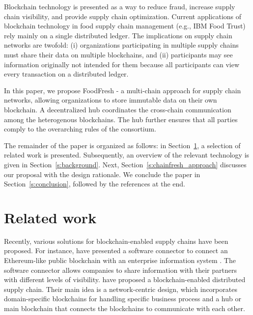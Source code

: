 \documentclass[conference]{IEEEtran}
\begin{document}
Blockchain technology is presented as a way to reduce fraud, increase supply chain visibility, and provide supply chain optimization. Current applications of blockchain technology in food supply chain management (e.g., IBM Food Trust) rely mainly on a single distributed ledger. The implications on supply chain networks are twofold: (i) organizations participating in multiple supply chains must share their data on multiple blockchains, and (ii) participants may see information originally not intended for them because all participants can view every transaction on a distributed ledger. 

In this paper, we propose FoodFresh - a multi-chain approach for supply chain networks, allowing organizations to store immutable data on their own blockchain. A decentralized hub coordinates the cross-chain communication among the heterogenous blockchains.  The hub further ensures that all parties comply to the overarching rules of the consortium. 

The remainder of the paper is organized as follows: in Section~\ref{s:related_work}, a selection of related work is presented. Subsequently, an overview of the relevant technology is given in Section~\ref{s:background}. Next, Section~\ref{s:chainfresh_approach} discusses our proposal with the design rationale. We conclude the paper in Section~\ref{s:conclusion}, followed by the references at the end. 

\section{Related work} \label{s:related_work}
Recently, various solutions for blockchain-enabled supply chains have been proposed. For instance, \citeauthor{longo2019blockchain} have presented a software connector to connect an Ethereum-like public blockchain with an enterprise information system \cite{longo2019blockchain}. The software connector allows companies to share information with their partners with different levels of visibility. \citeauthor{schulz2018multichain} \cite{schulz2018multichain} have proposed a blockchain-enabled distributed supply chain. Their main idea is a network-centric design, which incorporates domain-specific blockchains for handling specific business process and a hub or main blockchain that connects the blockchains to communicate with each other. 
\end{document}
